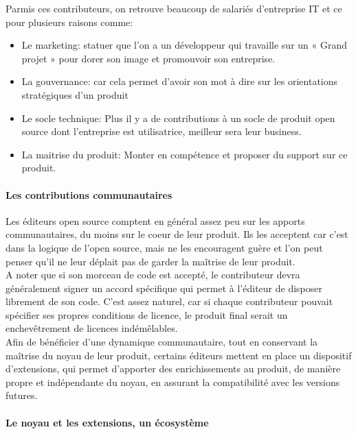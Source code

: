 				Parmis ces contributeurs, on retrouve beaucoup de salariés d'entreprise IT et ce pour plusieurs raisons comme:

				\begin{itemize}[label=\textbullet, font=\LARGE \color{burntorange}]
					\item Le marketing: statuer que l'on a un développeur qui travaille sur un « Grand projet » pour dorer son image et promouvoir son entreprise.
					\item La gouvernance: car cela permet d'avoir son mot à dire sur les orientations stratégiques d'un produit
					\item Le socle technique: Plus il y a de contributions à un socle de produit open source dont l'entreprise est utilisatrice, meilleur sera leur business.
					\item La maitrise du produit: Monter en compétence et proposer du support sur ce produit.
				\end{itemize}

				\paragraph{Les contributions communautaires\\}

				Les éditeurs open source comptent en général assez peu sur les apports communautaires, du moins sur le coeur de leur produit. Ils les acceptent car c'est dans la logique de l'open source, mais ne les encouragent guère et l'on peut penser qu'il ne leur déplait pas de garder la maîtrise de leur produit.\\

				A noter que si son morceau de code est accepté, le contributeur devra généralement signer un accord spécifique qui permet à l'éditeur de disposer librement de son code. C'est assez naturel, car si chaque contributeur pouvait spécifier ses propres conditions de licence, le produit final serait un enchevêtrement de licences indémêlables.\\

				Afin de bénéficier d'une dynamique communautaire, tout en conservant la maîtrise du noyau de leur produit, certains éditeurs mettent en place un dispositif d'extensions, qui permet d'apporter des enrichissements au produit, de manière propre et indépendante du noyau, en assurant la compatibilité avec les versions futures.

				\paragraph{Le noyau et les extensions, un écosystème\\}

